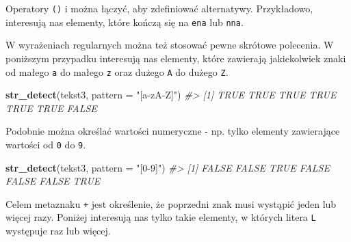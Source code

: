 \documentclass[paper=6in:9in,pagesize=pdftex,headinclude=on,footinclude=on,10pt]{scrbook}
\newenvironment{Shaded}{\begin{snugshade}}{\end{snugshade}}
\newcommand{\CommentTok}[1]{\textcolor[rgb]{0.56,0.35,0.01}{\textit{#1}}}
\newcommand{\DataTypeTok}[1]{\textcolor[rgb]{0.13,0.29,0.53}{#1}}
\newcommand{\KeywordTok}[1]{\textcolor[rgb]{0.13,0.29,0.53}{\textbf{#1}}}
\newcommand{\NormalTok}[1]{#1}
\newcommand{\StringTok}[1]{\textcolor[rgb]{0.31,0.60,0.02}{#1}}
\begin{document}
\begin{Shaded}
\end{Shaded}

Operatory \texttt{()} i \texttt{\textbar{}} można łączyć, aby zdefiniować alternatywy.
Przykładowo, interesują nas elementy, które kończą się na \texttt{ena} lub \texttt{nna}.

\begin{Shaded}
\end{Shaded}

W wyrażeniach regularnych można też stosować pewne skrótowe polecenia.
W poniższym przypadku interesują nas elementy, które zawierają jakiekolwiek znaki od małego \texttt{a} do małego \texttt{z} oraz dużego \texttt{A} do dużego \texttt{Z}.

\begin{Shaded}
\begin{Highlighting}[]
\KeywordTok{str_detect}\NormalTok{(tekst3, }\DataTypeTok{pattern =} \StringTok{"[a-zA-Z]"}\NormalTok{)}
\CommentTok{#> [1]  TRUE  TRUE  TRUE  TRUE  TRUE  TRUE FALSE}
\end{Highlighting}
\end{Shaded}

Podobnie można określać wartości numeryczne - np. tylko elementy zawierające wartości od \texttt{0} do \texttt{9}.

\begin{Shaded}
\begin{Highlighting}[]
\KeywordTok{str_detect}\NormalTok{(tekst3, }\DataTypeTok{pattern =} \StringTok{"[0-9]"}\NormalTok{)}
\CommentTok{#> [1] FALSE FALSE  TRUE FALSE FALSE FALSE  TRUE}
\end{Highlighting}
\end{Shaded}

Celem metaznaku \texttt{+} jest określenie, że poprzedni znak musi wystąpić jeden lub więcej razy.
Poniżej interesują nas tylko takie elementy, w których litera \texttt{L} występuje raz lub więcej.
\end{document}
